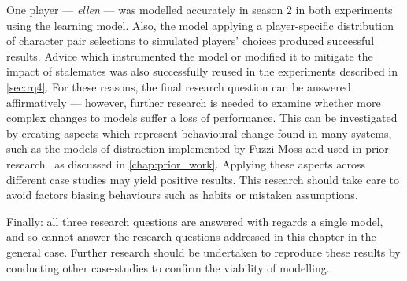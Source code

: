 One player --- \emph{ellen} --- was modelled accurately in season 2 in both
experiments using the learning model. Also, the model applying a player-specific
distribution of character pair selections to simulated players' choices produced
successful results. Advice which instrumented the model or modified it to
mitigate the impact of stalemates was also successfully reused in the
experiments described in \cref{sec:rq4}. For these reasons, the final research
question can be answered affirmatively --- however, further research is needed
to examine whether more complex changes to models suffer a loss of performance.
This can be investigated by creating
aspects which represent behavioural change found in many systems, such as the
models of distraction implemented by Fuzzi-Moss\cite{fuzzimoss_repo} and used in
prior research~\cite{wallis2018caise} as discussed in \cref{chap:prior_work}.
Applying these aspects across different case studies may yield positive results.
This research should take care to avoid factors biasing behaviours such as
habits or mistaken assumptions.

Finally: all three research questions are answered with regards a single model,
and so cannot answer the research questions addressed in this chapter in the
general case. Further research should be undertaken to reproduce these results
by conducting other case-studies to confirm the viability of \aspectoriented
modelling. 
